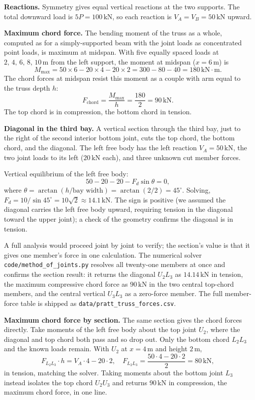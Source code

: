 

\textbf{Reactions.} Symmetry gives equal vertical reactions at the
two supports. The total downward load is $5P = 100\,\text{kN}$,
so each reaction is $V_A = V_B = 50\,\text{kN}$ upward.

\textbf{Maximum chord force.} The bending moment of the truss as a
whole, computed as for a simply-supported beam with the joint
loads as concentrated point loads, is maximum at midspan. With
five equally spaced loads at $2,\,4,\,6,\,8,\,10\,\si{\meter}$ from
the left support, the moment at midspan ($x = 6\,\si{\meter}$) is
\[
M_{\max} = 50 \times 6 - 20 \times 4 - 20 \times 2 =
300 - 80 - 40 = 180\,\text{kN}\cdot\text{m}.
\]
The chord forces at midspan resist this moment as a couple with
arm equal to the truss depth $h$:
\[
F_{\text{chord}} = \frac{M_{\max}}{h} = \frac{180}{2} =
90\,\text{kN}.
\]
The top chord is in compression, the bottom chord in tension.

\textbf{Diagonal in the third bay.} A vertical section through
the third bay, just to the right of the second interior bottom
joint, cuts the top chord, the bottom chord, and the diagonal. The
left free body has the left reaction $V_A = 50\,\text{kN}$, the
two joint loads to its left ($20\,\text{kN}$ each), and three
unknown cut member forces.

Vertical equilibrium of the left free body:
\[
50 - 20 - 20 - F_d \sin\theta = 0,
\]
where $\theta = \arctan(h / \text{bay width}) = \arctan(2/2) =
45^{\circ}$. Solving, $F_d = 10 / \sin 45^{\circ} = 10\sqrt{2}
\approx 14.1\,\text{kN}$. The sign is positive (we assumed the
diagonal carries the left free body upward, requiring tension in
the diagonal toward the upper joint); a check of the geometry
confirms the diagonal is in tension.

A full analysis would proceed joint by joint to verify; the
section's value is that it gives one member's force in one
calculation. The numerical solver
\texttt{code/method\_of\_joints.py} resolves all twenty-one members at
once and confirms the section result: it returns the diagonal $U_2L_3$
as $14.14\,\text{kN}$ in tension, the maximum compressive chord force as
$90\,\text{kN}$ in the two central top-chord members, and the central
vertical $U_3L_3$ as a zero-force member. The full member-force table is
shipped as \texttt{data/pratt\_truss\_forces.csv}.

\textbf{Maximum chord force by section.} The same section gives the
chord forces directly. Take moments of the left free body about the top
joint $U_2$, where the diagonal and top chord both pass and so drop out.
Only the bottom chord $L_2L_3$ and the known loads remain. With $U_2$ at
$x = 4\,\si{\meter}$ and height $2\,\si{\meter}$,
\[
F_{L_2L_3} \cdot h = V_A \cdot 4 - 20 \cdot 2,\quad
F_{L_2L_3} = \frac{50 \cdot 4 - 20 \cdot 2}{2} = 80\,\text{kN},
\]
in tension, matching the solver. Taking moments about the bottom joint
$L_3$ instead isolates the top chord $U_2U_3$ and returns
$90\,\text{kN}$ in compression, the maximum chord force, in one line.


